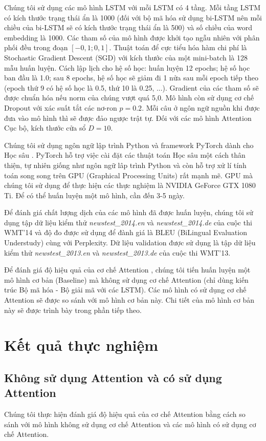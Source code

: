 Chúng tôi sử dụng các mô hình LSTM với mỗi LSTM có 4 tầng. Mỗi tầng LSTM có kích thước trạng thái ẩn là 1000 (đối với bộ mã hóa sử dụng bi-LSTM nên mỗi chiều của bi-LSTM sẽ có kích thước trạng thái ẩn là 500) và số chiều của word embedding là 1000. Các tham số của mô hình được khởi tạo ngẫu nhiên với phân phối đều trong đoạn $[-0,1; 0,1]$. Thuật toán để cực tiểu hóa hàm chi phí là Stochastic Gradient Descent (SGD) với kích thước của một mini-batch là 128 mẫu huấn luyện. Cách lập lịch cho hệ số học: huấn luyện 12 epochs; hệ số học ban đầu là 1.0; sau 8 epochs, hệ số học sẽ giảm đi 1 nửa sau mỗi epoch tiếp theo (epoch thứ 9 có hệ số học là 0.5, thứ 10 là 0.25, ...). Gradient của các tham số sẽ được chuẩn hóa nếu norm của chúng vượt quá 5,0. Mô hình còn sử dụng cơ chế Dropout với xác suất tắt các nơ-ron $p = 0.2$. Mỗi câu ở ngôn ngữ nguồn khi được đưa vào mô hình thì sẽ được đảo ngược trật tự. Đối với các mô hình Attention Cục bộ, kích thước cửa sổ $D = 10$.

Chúng tôi sử dụng ngôn ngữ lập trình Python và framework PyTorch dành cho Học sâu \cite{pytorchworkshop}. PyTorch hỗ trợ việc cài đặt các thuật toán Học sâu một cách thân thiện, tự nhiên giống như ngôn ngữ lâp trình Python và còn hỗ trợ xử lí tính toán song song trên GPU (Graphical Processing Units) rất mạnh mẽ. GPU mà chúng tôi sử dụng để thực hiện các thực nghiệm là NVIDIA GeForce GTX 1080 Ti. Để có thể huấn luyện một mô hình, cần đến 3-5 ngày.

Để đánh giá chất lượng dịch của các mô hình đã được huấn luyện, chúng tôi sử dụng tập dữ liệu kiểm thử \textit{newstest\_2014.en} và \textit{newstest\_2014.de} của cuộc thi WMT'14 và độ đo được sử dụng để đành giá là BLEU (BiLingual Evaluation Understudy) \cite{BLEUpaper} cùng với Perplexity. Dữ liệu validation được sử dụng là tập dữ liệu kiểm thử \textit{newstest\_2013.en} và \textit{newstest\_2013.de} của cuộc thi WMT'13.

Để đánh giá độ hiệu quả của cơ chế Attention , chúng tôi tiến huấn luyện một mô hình cơ bản (Baseline) mà không sử dụng cơ chế Attention (chỉ dùng kiến trúc Bộ mã hóa - Bộ giải mã với các LSTM). Các mô hình có sử dụng cơ chế Attention sẽ được so sánh với mô hình cơ bản này. Chi tiết của mô hình cơ bản này sẽ được trình bày trong phần tiếp theo.

\section{Kết quả thực nghiệm}
\subsection{Không sử dụng Attention và có sử dụng Attention}
Chúng tôi thực hiện đánh giá độ hiệu quả của cơ chế Attention bằng cách so sánh với mô hình không sử dụng cơ chế Attention và các mô hình có sử dụng cơ chế Attention.

